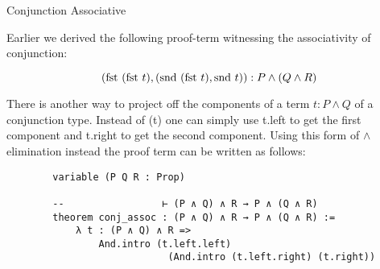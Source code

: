 \documentclass{book}
\begin{document}
    \begin{eg}{Conjunction Associative}
        
        Earlier we derived the following proof-term witnessing the associativity of conjunction:

        $$ (\text{fst} \ (\text{fst} \ t), (\text{snd} \ (\text{fst} \ t), \text{snd} \ t)) : P \land (Q \land R) $$

        There is another way to project off the components of a term $t : P \land Q$ of a conjunction type. Instead of (\fst t) one can simply use t.left to get the first component and t.right to get the second component. Using this form of $\land$ elimination instead the proof term can be written as follows: 

        \begin{lstlisting}
        variable (P Q R : Prop)
        
        --                 ⊢ (P ∧ Q) ∧ R → P ∧ (Q ∧ R)
        theorem conj_assoc : (P ∧ Q) ∧ R → P ∧ (Q ∧ R) :=
            λ t : (P ∧ Q) ∧ R =>
                And.intro (t.left.left)
                            (And.intro (t.left.right) (t.right))
        \end{lstlisting}        
    \end{eg}
\end{document}
